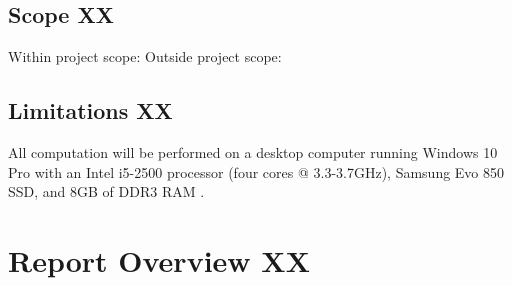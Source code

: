 \subsection{Scope XX}
Within project scope:
Outside project scope:
\subsection{Limitations XX}
All computation will be performed on a desktop computer running Windows 10 Pro with an Intel i5-2500 processor (four cores @ 3.3-3.7GHz), Samsung Evo 850 SSD, and 8GB of DDR3 RAM .




\section{Report Overview XX}


